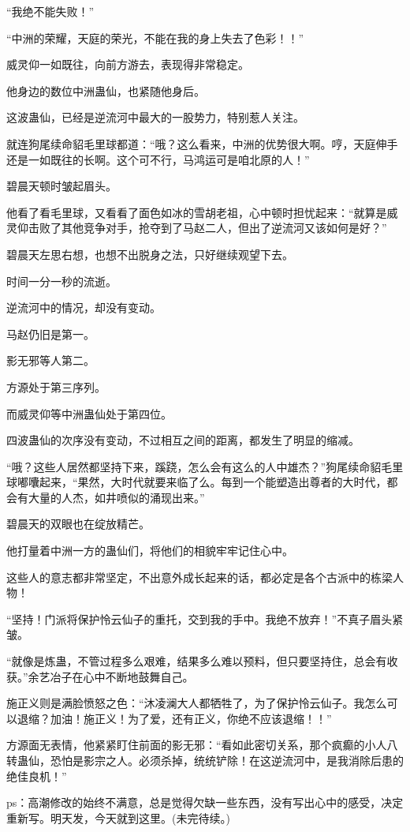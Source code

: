 \begin{this_body}
“我绝不能失败！”

“中洲的荣耀，天庭的荣光，不能在我的身上失去了色彩！！”

威灵仰一如既往，向前方游去，表现得非常稳定。

他身边的数位中洲蛊仙，也紧随他身后。

这波蛊仙，已经是逆流河中最大的一股势力，特别惹人关注。

就连狗尾续命貂毛里球都道：“哦？这么看来，中洲的优势很大啊。哼，天庭伸手还是一如既往的长啊。这个可不行，马鸿运可是咱北原的人！”

碧晨天顿时皱起眉头。

他看了看毛里球，又看看了面色如冰的雪胡老祖，心中顿时担忧起来：“就算是威灵仰击败了其他竞争对手，抢夺到了马赵二人，但出了逆流河又该如何是好？”

碧晨天左思右想，也想不出脱身之法，只好继续观望下去。

时间一分一秒的流逝。

逆流河中的情况，却没有变动。

马赵仍旧是第一。

影无邪等人第二。

方源处于第三序列。

而威灵仰等中洲蛊仙处于第四位。

四波蛊仙的次序没有变动，不过相互之间的距离，都发生了明显的缩减。

“哦？这些人居然都坚持下来，蹊跷，怎么会有这么的人中雄杰？”狗尾续命貂毛里球嘟囔起来，“果然，大时代就要来临了么。每到一个能塑造出尊者的大时代，都会有大量的人杰，如井喷似的涌现出来。”

碧晨天的双眼也在绽放精芒。

他打量着中洲一方的蛊仙们，将他们的相貌牢牢记住心中。

这些人的意志都非常坚定，不出意外成长起来的话，都必定是各个古派中的栋梁人物！

“坚持！门派将保护怜云仙子的重托，交到我的手中。我绝不放弃！”不真子眉头紧皱。

“就像是炼蛊，不管过程多么艰难，结果多么难以预料，但只要坚持住，总会有收获。”余艺冶子在心中不断地鼓舞自己。

施正义则是满脸愤怒之色：“沐凌澜大人都牺牲了，为了保护怜云仙子。我怎么可以退缩？加油！施正义！为了爱，还有正义，你绝不应该退缩！！”

方源面无表情，他紧紧盯住前面的影无邪：“看如此密切关系，那个疯癫的小人八转蛊仙，恐怕是影宗之人。必须杀掉，统统铲除！在这逆流河中，是我消除后患的绝佳良机！”

ps：高潮修改的始终不满意，总是觉得欠缺一些东西，没有写出心中的感受，决定重新写。明天发，今天就到这里。(未完待续。)

\end{this_body}

